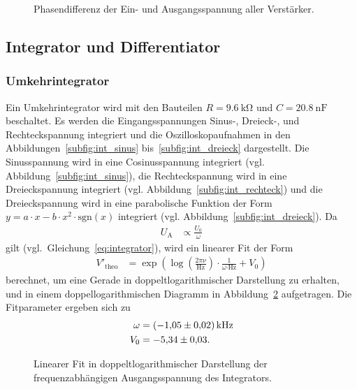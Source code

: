 \begin{figure}[ht]
  \centering
  
  \caption{Phasendifferenz der Ein- und Ausgangsspannung aller Verstärker.}
  \label{fig:phasendiff}
\end{figure}

\FloatBarrier

\subsection{Integrator und Differentiator}
\subsubsection{Umkehrintegrator}
Ein Umkehrintegrator wird mit den Bauteilen $R = \SI{9.6}{\kilo\ohm}$ und $C = \SI{20.8}{\nano\farad}$ beschaltet.
Es werden die Eingangsspannungen Sinus-, Dreieck-, und Rechteckspannung integriert und die Oszilloskopaufnahmen in den Abbildungen~\ref{subfig:int_sinus} bis~\ref{subfig:int_dreieck} dargestellt.
Die Sinusspannung wird in eine Cosinusspannung integriert (vgl. Abbildung~\ref{subfig:int_sinus}),
die Rechteckspannung wird in eine Dreieckspannung integriert (vgl. Abbildung~\ref{subfig:int_rechteck})
und die Dreieckspannung wird in eine parabolische Funktion der Form $y = a \cdot x - b \cdot x^2 \cdot \text{sgn}(x)$ integriert (vgl. Abbildung~\ref{subfig:int_dreieck}).
Da
\begin{align*}
  U_\text{A} &\propto \frac{U_0}{\omega}
\end{align*}
gilt (vgl.\ Gleichung~\eqref{eq:integrator}),
wird ein linearer Fit der Form
\begin{align*}
  V'_\text{theo} &= \exp\!{\left(\log\!{\left(\frac{2 \pi \nu}{\si{\hertz}}\right)} \cdot \frac{1}{\omega\si{\cdot\hertz}} + V_0 \right)}
\end{align*}
berechnet, um eine Gerade in doppeltlogarithmischer Darstellung zu erhalten,
und in einem doppellogarithmischen Diagramm in Abbildung~\ref{fig:int} aufgetragen.
Die Fitparameter ergeben sich zu
\begin{align*}
  \omega &= \SI{-1.05 \pm 0.02}{\kilo\hertz} \\
  V_0 &= \num{-5.34 \pm 0.03}.
\end{align*}

\begin{figure}[ht]
  \centering
  
  \caption{Linearer Fit in doppeltlogarithmischer Darstellung der frequenzabhängigen Ausgangsspannung des Integrators.}
  \label{fig:int}
\end{figure}

